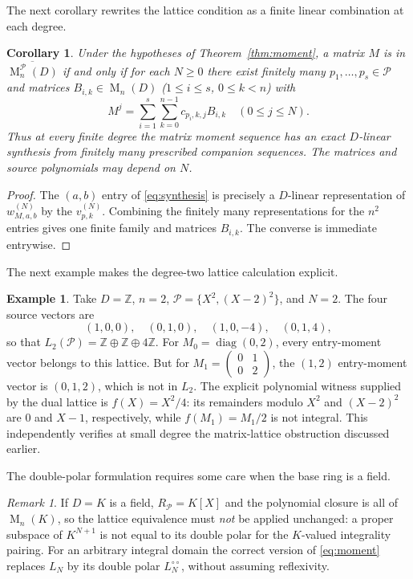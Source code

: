 \documentclass[11pt]{amsart}
\newtheorem{corollary}[theorem]{Corollary}
\theoremstyle{definition}
\newtheorem{example}[theorem]{Example}
\theoremstyle{remark}
\newtheorem{remark}[theorem]{Remark}
\newcommand{\Mat}{\operatorname{M}}
\begin{document}
The next corollary rewrites the lattice condition as a finite linear combination at each degree.
\begin{corollary}
Under the hypotheses of Theorem~\ref{thm:moment}, a matrix $M$ is in
$\overline{\Mat_n^{\mathcal P}(D)}$ if and only if for each $N\ge0$
there exist finitely many $p_1,\ldots,p_s\in\mathcal P$ and matrices
$B_{i,k}\in\Mat_n(D)$ ($1\le i\le s$, $0\le k<n$) with
\begin{equation}\label{eq:synthesis}
M^j=\sum_{i=1}^s\sum_{k=0}^{n-1}c_{p_i,k,j} B_{i,k}
\quad (0\le j\le N).
\end{equation}
Thus at every finite degree the matrix moment sequence has an
\emph{exact $D$-linear synthesis} from finitely many prescribed
companion sequences.  The matrices and source polynomials may depend
on $N$.
\end{corollary}
\begin{proof}
The $(a,b)$ entry of \eqref{eq:synthesis} is precisely a
$D$-linear representation of $w^{(N)}_{M,a,b}$ by the
$v^{(N)}_{p,k}$.  Combining the finitely many representations
for the $n^2$ entries gives one finite family and matrices $B_{i,k}$.
The converse is immediate entrywise.
\end{proof}


The next example makes the degree-two lattice calculation explicit.
\begin{example}
Take $D=\mathbb Z$, $n=2$, $\mathcal P=\{X^2,(X-2)^2\}$,
and $N=2$.  The four source vectors are
\[
(1,0,0),\quad(0,1,0),\quad(1,0,-4),\quad(0,1,4),
\]
so that $L_2(\mathcal P)=\mathbb Z\oplus\mathbb Z\oplus4\mathbb Z$.
For $M_0=\operatorname{diag}(0,2)$, every entry-moment vector
belongs to this lattice.  But for
$M_1=\left(\begin{smallmatrix}0&1\\0&2\end{smallmatrix}\right)$,
the $(1,2)$ entry-moment vector is $(0,1,2)$, which is not in
$L_2$.  The explicit polynomial witness supplied by the dual
lattice is $f(X)=X^2/4$: its remainders modulo $X^2$ and
$(X-2)^2$ are $0$ and $X-1$, respectively, while
$f(M_1)=M_1/2$ is not integral.  This independently verifies
at small degree the matrix-lattice obstruction discussed earlier.
\end{example}


The double-polar formulation requires some care when the base ring is a field.
\begin{remark}
If $D=K$ is a field, $R_{\mathcal P}=K[X]$ and the polynomial closure
is all of $\Mat_n(K)$, so the lattice equivalence must \emph{not}
be applied unchanged: a proper subspace of $K^{N+1}$ is not
equal to its double polar for the $K$-valued integrality pairing.
For an arbitrary integral domain the correct version
of \eqref{eq:moment} replaces $L_N$ by its double polar
$L_N^{\circ\circ}$, without assuming reflexivity.
\end{remark}
\end{document}

